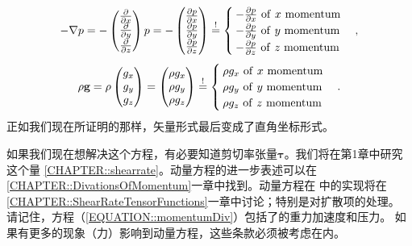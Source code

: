 \documentclass[LBMDerivation.tex]{subfiles}
\begin{document}
\begin{equation*}
  -  \nabla p
=
  -
  \left(
  \begin{matrix}
   \frac{\partial}{\partial x} \\
   \frac{\partial}{\partial y} \\
   \frac{\partial}{\partial z}
  \end{matrix}
  \right) p
=
-
  \left(
  \begin{matrix}
   \frac{\partial p}{\partial x} \\
   \frac{\partial p}{\partial y} \\
   \frac{\partial p}{\partial z}
  \end{matrix}
  \right)
\overset{!}{=}
  \begin{cases}
  -\frac{\partial p}{\partial x} ~ \mathrm{of~}x ~ \mathrm{momentum} \\
  -\frac{\partial p}{\partial y} ~ \mathrm{of~}y ~ \mathrm{momentum} \\
  -\frac{\partial p}{\partial z} ~ \mathrm{of~}z ~ \mathrm{momentum}
  \end{cases},
\end{equation*}
\begin{equation*}
  \rho \textbf{g}
=
  \rho
  \left(
  \begin{matrix}
    g_x \\
    g_y \\
    g_z
  \end{matrix}
  \right)
=
  \left(
  \begin{matrix}
    \rho g_x \\
    \rho g_y \\
    \rho g_z
  \end{matrix}
  \right)
\overset{!}{=}
  \begin{cases}
  \rho g_x ~ \mathrm{of~}x ~ \mathrm{momentum} \\
  \rho g_y ~ \mathrm{of~}y ~ \mathrm{momentum} \\
  \rho g_z ~ \mathrm{of~}z ~ \mathrm{momentum}
  \end{cases} .
\end{equation*}
%
%
正如我们现在所证明的那样，矢量形式最后变成了直角坐标形式。
	 
如果我们现在想解决这个方程，有必要知道剪切率张量$\boldsymbol \tau$。我们将在第1章中研究这个量 \ref{CHAPTER::shearrate}。动量方程的进一步表述可以在 \ref{CHAPTER::DivationsOfMomentum}一章中找到。动量方程在  \OF 中的实现将在 \ref{CHAPTER::ShearRateTensorFunctions}一章中讨论；特别是对扩散项的处理。 请记住，方程（\ref{EQUATION::momentumDiv}）包括了的重力加速度和压力。 如果有更多的现象（力）影响到动量方程，这些条款必须被考虑在内。
%
%
%
\end{document}
